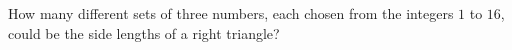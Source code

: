 How many different sets of three numbers, each chosen from the integers $1$ to $16$, could be the side lengths of a right triangle?
